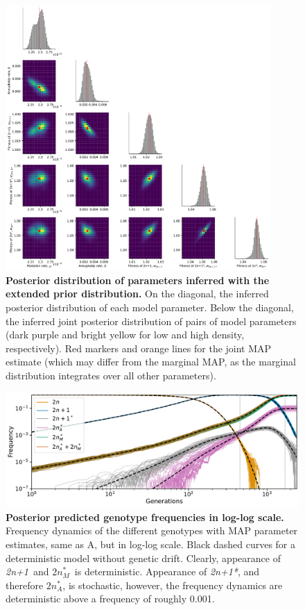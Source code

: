\documentclass[12pt]{extarticle}
\newcommand{\anwt}{\emph{2n+1}}
\newcommand{\eumtM}{\emph{$2n^*_M$}}
\newcommand{\eumtA}{\emph{$2n^*_A$}}
\newcommand{\anmt}{\emph{2n+1*}}
\begin{document}
\begin{figure}[p]
  \centering
  \includegraphics[width=0.9\textwidth]{../figures/posterior-alt.pdf}
  \caption{
  \textbf{Posterior distribution of parameters inferred with the extended prior distribution.}
On the diagonal, the inferred posterior distribution of each model parameter. 
Below the diagonal, the inferred joint posterior distribution of pairs of model parameters (dark purple and bright yellow for low and high density, respectively). Red markers and orange lines for the joint MAP estimate (which may differ from the marginal MAP, as the marginal distribution integrates over all other parameters).
} 
  \label{fig:posterior-alt}
\end{figure}


\begin{figure}[p]
    \centering
	\includegraphics[width=\textwidth]{../figures/MAP_freq_dynamics.pdf}
	\caption{\textbf{Posterior predicted genotype frequencies in log-log scale.}
	Frequency dynamics of the different genotypes with MAP parameter estimates, same as A, but in log-log scale. Black dashed curves for a deterministic model without genetic drift. 
	Clearly, appearance of \anwt\ and \eumtM\ is deterministic.
	Appearance of \anmt, and therefore \eumtA, is stochastic, however, the frequency dynamics are deterministic above a frequency of roughly 0.001. 
	}
    \label{fig:MAP_freq_dynamics_log}    
\end{figure}
\end{document}
